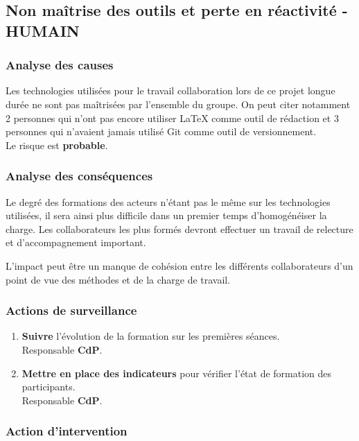 \documentclass[twoside]{article}
\begin{document}
\subsection{Non maîtrise des outils et perte en réactivité - HUMAIN}
\subsubsection{Analyse des causes}

Les technologies utilisées pour le travail collaboration lors de ce projet
longue durée ne sont pas maîtrisées par l'ensemble du groupe.
On peut citer notamment 2 personnes qui n'ont pas encore utiliser \LaTeX
comme outil de rédaction et 3 personnes qui n'avaient jamais utilisé Git
comme outil de versionnement.\\
Le risque est {\bf probable}.

\subsubsection{Analyse des conséquences}

Le degré des formations des acteurs n'étant pas le même sur les technologies
utilisées, il sera ainsi plus difficile dans un premier temps d'homogénéiser
la charge. Les collaborateurs les plus formés devront effectuer un travail de
relecture et d'accompagnement important. 

L'impact peut être un manque de cohésion entre les différents collaborateurs
d'un point de vue des méthodes et de la charge de travail.

\subsubsection{Actions de surveillance}

\begin{enumerate}
\item {\bf Suivre} l'évolution de la formation sur les premières séances.\\ 
Responsable {\bf CdP}.
\item {\bf Mettre en place des indicateurs} pour vérifier l'état de formation
des participants.\\
Responsable {\bf CdP}.
\end{enumerate}

\subsubsection{Action d'intervention}
\end{document}
